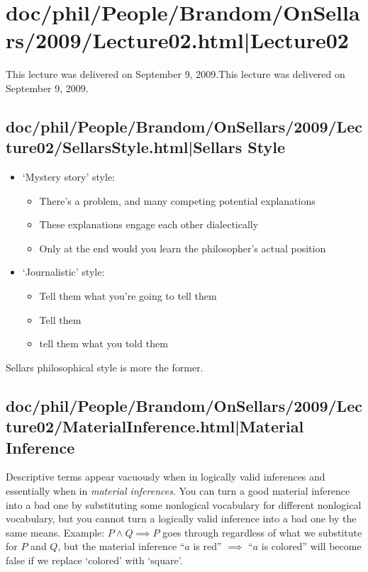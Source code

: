 \documentclass[12pt,a4paper]{report}
\begin{document}
\section{doc/phil/People/Brandom/OnSellars/2009/Lecture02.html|Lecture02}
This lecture was delivered on September 9, 2009.This lecture was delivered on September 9, 2009.

\subsection{doc/phil/People/Brandom/OnSellars/2009/Lecture02/SellarsStyle.html|Sellars Style}

\begin{itemize}
\item `Mystery story' style:
    \begin{itemize}
        \item There's a problem, and many competing potential explanations
        \item These explanations engage each other dialectically
        \item Only at the end would you learn the philosopher's actual position
    \end{itemize}
\item `Journalistic' style:
    \begin{itemize}
        \item Tell them what you're going to tell them
        \item Tell them
        \item tell them what you told them
    \end{itemize}
\end{itemize}

Sellars philosophical style is more the former.
\subsection{doc/phil/People/Brandom/OnSellars/2009/Lecture02/MaterialInference.html|Material Inference}

Descriptive terms appear vacuously when in logically valid inferences and essentially when in \emph{material inferences}. You can turn a good material inference into a bad one by substituting some nonlogical vocabulary for different nonlogical vocabulary, but you cannot turn a logically valid inference into a bad one by the same means. Example: $P \land Q \implies P$ goes through regardless of what we substitute for $P$ and $Q$, but the material inference ``$a$ is red'' $\implies$ ``$a$ is colored'' will become false if we replace `colored' with `square'.
\end{document}
